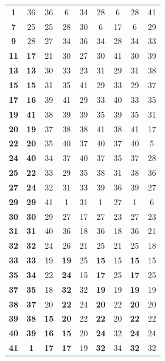\documentclass[10p]{article}
\theoremstyle{definition}
\theoremstyle{definition}
\begin{document}
\begin{appendices}
\begin{table}[!ht]
\begin{tabular}{*{9}{c}}
\textbf{1} &36 &36  & 6&34 &28 & 6&28 &41\\ 
\textbf{7} &25 & 25 & 28& 30 &6 & 17&6 &29\\ 
\textbf{9} &28 & 27 &34 &36 &34 &28 &34 &33\\ 
\textbf{11} &\textbf{17} & 21 &30 &27 &30 & 41&30 &39\\ 
\textbf{13} & \textbf{13}& 30 & 33& 23&31 &29 &31 &38\\ 
\textbf{15} &\textbf{15} & 31 & 35& 41&29 &33 &29 &37\\ 
\textbf{17} &\textbf{16} & 39 & 41&29 &33 & 40&33 &35\\ 
\textbf{19} & \textbf{41}&  38& 39& 39&35 &39 &35 &31\\ 
\textbf{20} &\textbf{19} & 37 & 38& 38&41 & 38&41 &17\\ 
\textbf{22} &\textbf{20} & 35  & 40&37 &40 &37 &40 &5\\ 
\textbf{24} &\textbf{40} & 34 & 37& 40&37 &35 &37 &28\\
\textbf{25} & \textbf{22}& 33 & 29&35 & 38& 31&38 &36\\ 
\textbf{27} &\textbf{24} & 32 & 31&33 &39 & 36&39 &27\\ 
\textbf{29} &\textbf{29} & 41 & 1& 31& 1& 27&1 &6\\ 
\textbf{30} & \textbf{30}& 29 & 27& 17&27 & 23&27 &23\\ 
\textbf{31} &\textbf{31} & 40 & 36& 18&36 &18 &36 &21\\ 
\textbf{32} &\textbf{32} & 24 & 26&21 &25 & 21&25 &18\\ 
\textbf{33} &\textbf{33} & 19 & \textbf{19}&25 &\textbf{15} & 15&\textbf{15} &15\\ 
\textbf{35} &\textbf{34} & 22 & \textbf{24}& 15& \textbf{17}& 25&\textbf{17} &25\\ 
\textbf{37} &\textbf{35} & 18 & \textbf{32}& 32& \textbf{19}&19 &\textbf{19} &19\\ 
\textbf{38} &\textbf{37} &20  & \textbf{22}& 24& \textbf{20}&22 &\textbf{20} &20\\ 
\textbf{39} &\textbf{38} & \textbf{15} & \textbf{20}&22 & \textbf{22}& 20&\textbf{22} &22\\ 
\textbf{40} &\textbf{39} &  \textbf{16}& \textbf{15}&20 &\textbf{24} & 32&\textbf{24} &24\\ 
\textbf{41} &\textbf{1} & \textbf{17} & \textbf{17}& 19& \textbf{32}& 34&\textbf{32} &32\\ 
 \hline
\bottomrule
\end{tabular}
\end{table}
\end{appendices}
\end{document}
